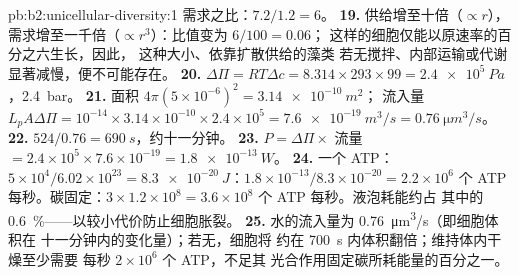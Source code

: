 \begin{solution}{pb:b2:unicellular-diversity:1}
需求之比：$7.2/1.2 = 6$。
\textbf{19.} 供给增至十倍（$\propto r$），
需求增至一千倍（$\propto r^3$）：比值变为 $6/100 = 0.06$；
这样的细胞仅能以原速率的百分之六生长，因此，
这种大小、依靠扩散供给的藻类
若无搅拌、内部运输或代谢显著减慢，便不可能存在。
\textbf{20.} $\Delta\Pi = RT\Delta c = 8.314\times 293\times 99 =
\qty{2.4e5}{Pa}$，\qty{2.4}{bar}。
\textbf{21.} 面积 $4\pi(5\times 10^{-6})^2 = \qty{3.14e-10}{m^2}$；
流入量 $L_p A\Delta\Pi = 10^{-14}\times 3.14\times 10^{-10}\times
2.4\times 10^5 = \qty{7.6e-19}{m^3/s} = \qty{0.76}{\micro m^3/s}$。
\textbf{22.} $524/0.76 = \qty{690}{s}$，约十一分钟。
\textbf{23.} $P = \Delta\Pi\times$ 流量 $= 2.4\times 10^5\times
7.6\times 10^{-19} = \qty{1.8e-13}{W}$。
\textbf{24.} 一个 ATP：$5\times 10^4/6.02\times 10^{23} =
\qty{8.3e-20}{J}$：$1.8\times 10^{-13}/8.3\times 10^{-20} = 2.2\times
10^6$ 个 ATP 每秒。碳固定：$3\times 1.2\times 10^8 =
3.6\times 10^8$ 个 ATP 每秒。液泡耗能约占
其中的 \qty{0.6}{\%}——以较小代价防止细胞胀裂。
\textbf{25.} 水的流入量为 \qty{0.76}{\micro m^3/s}（即细胞体积在
十一分钟内的变化量）；若无，细胞将
约在 \qty{700}{s} 内体积翻倍；维持体内干燥至少需要
每秒 $2\times 10^6$ 个 ATP，不足其
光合作用固定碳所耗能量的百分之一。
\end{solution}
